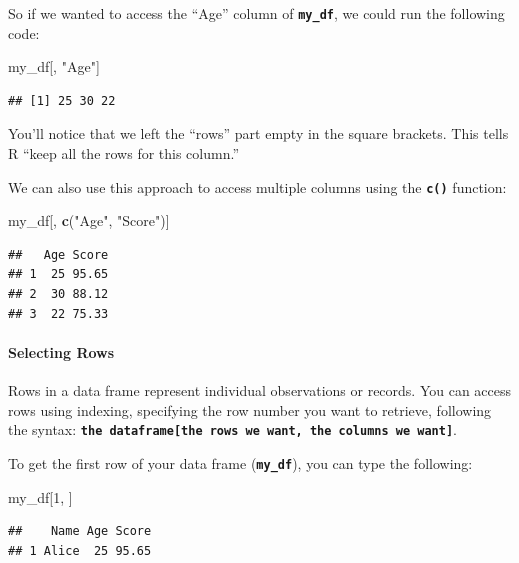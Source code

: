 \documentclass[
]{book}
\newenvironment{Shaded}{\begin{snugshade}}{\end{snugshade}}
\newcommand{\DecValTok}[1]{\textcolor[rgb]{0.00,0.00,0.81}{#1}}
\newcommand{\FunctionTok}[1]{\textcolor[rgb]{0.13,0.29,0.53}{\textbf{#1}}}
\newcommand{\NormalTok}[1]{#1}
\newcommand{\StringTok}[1]{\textcolor[rgb]{0.31,0.60,0.02}{#1}}
\begin{document}
So if we wanted to access the ``Age'' column of \textbf{\texttt{my\_df}}, we could run the following code:

\begin{Shaded}
\begin{Highlighting}[]
\NormalTok{my\_df[, }\StringTok{"Age"}\NormalTok{]}
\end{Highlighting}
\end{Shaded}

\begin{verbatim}
## [1] 25 30 22
\end{verbatim}

You'll notice that we left the ``rows'' part empty in the square brackets. This tells R ``keep all the rows for this column.''

We can also use this approach to access multiple columns using the \textbf{\texttt{c()}} function:

\begin{Shaded}
\begin{Highlighting}[]
\NormalTok{my\_df[, }\FunctionTok{c}\NormalTok{(}\StringTok{"Age"}\NormalTok{, }\StringTok{"Score"}\NormalTok{)]}
\end{Highlighting}
\end{Shaded}

\begin{verbatim}
##   Age Score
## 1  25 95.65
## 2  30 88.12
## 3  22 75.33
\end{verbatim}

\hypertarget{selecting-rows}{%
\paragraph{Selecting Rows}\label{selecting-rows}}

Rows in a data frame represent individual observations or records. You can access rows using indexing, specifying the row number you want to retrieve, following the syntax: \textbf{\texttt{the\ dataframe{[}the\ rows\ we\ want,\ the\ columns\ we\ want{]}}}.

To get the first row of your data frame (\textbf{\texttt{my\_df}}), you can type the following:

\begin{Shaded}
\begin{Highlighting}[]
\NormalTok{my\_df[}\DecValTok{1}\NormalTok{, ]}
\end{Highlighting}
\end{Shaded}

\begin{verbatim}
##    Name Age Score
## 1 Alice  25 95.65
\end{verbatim}
\end{document}
